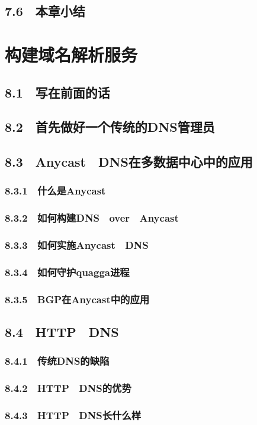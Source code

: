 \documentclass[12pt,UTF8]{ctexbook}
\begin{document}
{\section{7.6　本章小结}
\chapter{构建域名解析服务}
\section{8.1　写在前面的话}
\section{8.2　首先做好一个传统的DNS管理员}
\section{8.3　Anycast　DNS在多数据中心中的应用}
\subsection{8.3.1　什么是Anycast}
\subsection{8.3.2　如何构建DNS　over　Anycast}
\subsection{8.3.3　如何实施Anycast　DNS}
\subsection{8.3.4　如何守护quagga进程}
\subsection{8.3.5　BGP在Anycast中的应用}
\section{8.4　HTTP　DNS}
\subsection{8.4.1　传统DNS的缺陷}
\subsection{8.4.2　HTTP　DNS的优势}
\subsection{8.4.3　HTTP　DNS长什么样}
}
\end{document}
